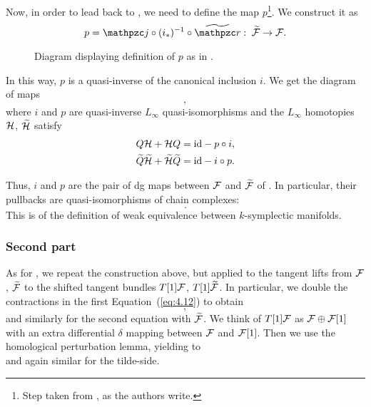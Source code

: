 Now, in order to lead back to , we need to define the map $p$\footnote{Step taken from \cite[Section 10.4.6]{Algebraic_operands_key_step}, as the authors write.}.
We construct it as
\begin{equation}
\label{eq:def_p}
    p = \cazz{j} \circ (i_*)^{-1} \circ \wt{\cazz{r}}:
    \; \wt{\F} \rightarrow \F .
\end{equation}
\begin{figure}
    \centering
    
    \caption{Diagram displaying definition of $p$ as in .}
    \label{fig:comm_diagram_def_p}
\end{figure}
In this way, $p$ is a quasi-inverse of the canonical inclusion $i$.
We get the diagram of maps
\begin{equation}
    ,
\end{equation}
where $i$ and $p$ are quasi-inverse $L_\infty$ quasi-isomorphisms and the $L_\infty$ homotopies $\mathcal{H}$, $\widetilde{\mathcal{H}}$ satisfy
\begin{equation}
\label{eq:L_infty_homotopies}
    \begin{aligned}
        Q \mathcal{H} + \mathcal{H} Q =&
        \; \text{id} - p \circ i , \\
        \widetilde{Q} \widetilde{\mathcal{H}} + \widetilde{\mathcal{H}} \widetilde{Q} =&
        \; \text{id} - i \circ p .
    \end{aligned}
\end{equation}

Thus, $i$ and $p$ are the pair of dg maps between $\mathcal{F}$ and $\widetilde{\mathcal{F}}$ of .
In particular, their pullbacks are quasi-isomorphisms of chain complexes:
\begin{equation}
     .
\end{equation}
This is  of the definition of weak equivalence between $k$-symplectic manifolds.

\subsubsection{Second part}
\label{subsubsec:second_part}

As for , we repeat the construction above, but applied to the tangent lifts from $\mathcal{F}$, $\widetilde{\mathcal{F}}$ to the shifted tangent bundles $T[1]\mathcal{F}$, $T[1]\widetilde{\mathcal{F}}$.
In particular, we double the contractions in the first Equation~(\ref{eq:4.12}) to obtain
\begin{equation}
    ,
\end{equation}
and similarly for the second equation with $\widetilde{\mathcal{F}}$.
We think of $T[1]\mathcal{F}$ as $\mathcal{F} \oplus \mathcal{F}[1]$ with an extra differential $\delta$ mapping between $\mathcal{F}$ and $\mathcal{F}[1]$.
Then we use the homological perturbation lemma, yielding to
\begin{equation}
    
\end{equation}
and again similar for the tilde-side.


